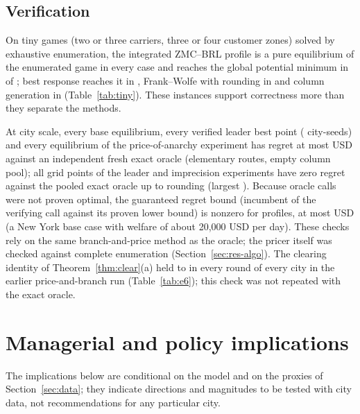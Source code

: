 \documentclass[preprint,12pt]{elsarticle}
\theoremstyle{definition}
\theoremstyle{remark}
\begin{document}
\subsection{Verification}\label{sec:res-verif}

On \TinyN{} tiny games (two or three carriers, three or four customer zones) solved by exhaustive enumeration, the integrated ZMC--BRL profile is a pure equilibrium of the enumerated game in every case and reaches the global potential minimum in \TinyZMCglobal{} of \TinyN; best response reaches it in \TinyBRglobal, Frank--Wolfe with rounding in \TinyFWglobal{} and column generation in \TinyCGglobal{} (Table~\ref{tab:tiny}). These instances support correctness more than they separate the methods.

At city scale, every base equilibrium, every verified leader best point (\CertN{} city-seeds) and every equilibrium of the price-of-anarchy experiment has regret at most \ExRegretFreshMax{} USD against an independent fresh exact oracle (elementary routes, empty column pool); all grid points of the leader and imprecision experiments have zero regret against the pooled exact oracle up to rounding (largest \EfourRegretMax). Because \ExUnproven{} oracle calls were not proven optimal, the guaranteed regret bound (incumbent of the verifying call against its proven lower bound) is nonzero for \ExBoundN{} profiles, at most \ExBoundMax{} USD (a New York base case with welfare of about 20{,}000 USD per day). These checks rely on the same branch-and-price method as the oracle; the pricer itself was checked against complete enumeration (Section~\ref{sec:res-algo}). The clearing identity of Theorem~\ref{thm:clear}(a) held to \EsixResid{} in every round of every city in the earlier price-and-branch run (Table~\ref{tab:e6}); this check was not repeated with the exact oracle.

\section{Managerial and policy implications}\label{sec:implications}

The implications below are conditional on the model and on the proxies of Section~\ref{sec:data}; they indicate directions and magnitudes to be tested with city data, not recommendations for any particular city.
\end{document}
